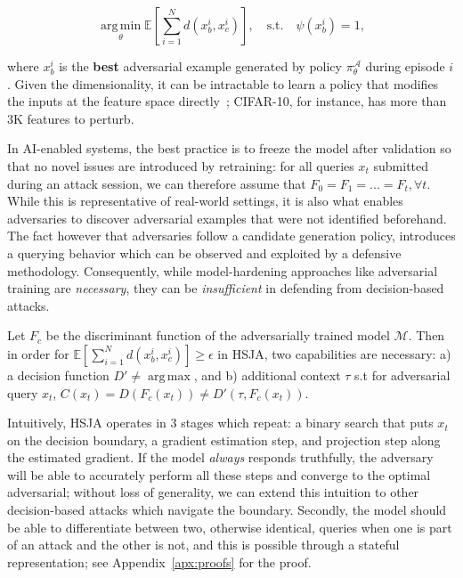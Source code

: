 \begin{equation}
    \operatorname*{arg\,min}_{\theta} \mathbb{E}[\sum_{i=1}^{N}d(x^i_b,x^i_c)], \quad \text{s.t.} \quad \psi(x^i_b) = 1,
\label{eqn:rew}
\end{equation}

\noindent where $x^i_b$ is the \textbf{best} adversarial example generated by policy $\pi_\theta^{\mathcal{A}}$ during episode $i$.
Given the dimensionality, it can be intractable to learn a policy that modifies the inputs at the feature space directly~\cite{pierazzi2020intriguing}; CIFAR-10, for instance, has more than 3K features to perturb.

In AI-enabled systems, the best practice is to freeze the model after validation so that no novel issues are introduced by retraining: for all queries $x_t$ submitted during an attack session, we can therefore assume that $F_0 = F_1 = ... = F_t, \forall t$.
While this is representative of real-world settings, it is also what enables adversaries to discover adversarial examples that were not identified beforehand.
The fact however that adversaries follow a candidate generation policy, introduces a querying behavior which can be observed and exploited by a defensive methodology.
Consequently, while model-hardening approaches like adversarial training are \emph{necessary}, they can be \emph{insufficient} in defending from decision-based attacks.

\begin{proposition}
Let $F_c$ be the discriminant function of the adversarially trained model $\mathcal{M}$. Then in order for $\mathbb{E}[\sum_{i=1}^{N}d(x^i_b,x^i_c)] \geq \epsilon$ in HSJA, two capabilities are necessary: a) a decision function $D' \neq \operatorname*{arg\,max}$, and b) additional context $\tau$ s.t for adversarial query $x_t$, $C(x_t) = D(F_c(x_t)) \neq D'(\tau, F_c(x_t))$.
\label{prop:one}
\end{proposition}

Intuitively, HSJA operates in 3 stages which repeat: a binary search that puts $x_t$ on the decision boundary, a gradient estimation step, and projection step along the estimated gradient.
If the model \emph{always} responds truthfully, the adversary will be able to accurately perform all these steps and converge to the optimal adversarial; without loss of generality, we can extend this intuition to other decision-based attacks which navigate the boundary.
Secondly, the model should be able to differentiate between two, otherwise identical, queries when one is part of an attack and the other is not, and this is possible through a stateful representation; see Appendix~\ref{apx:proofs} for the proof.

